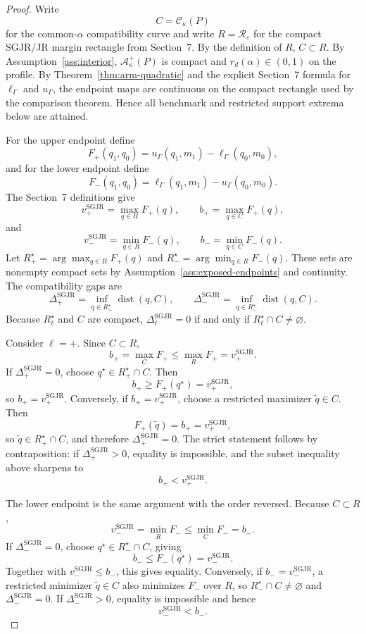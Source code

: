 \begin{proof}
Write
\[
  C=\mathcal C_\kappa(P)
\]
for the common-\(\alpha\) compatibility curve and write \(R=\mathcal R_\varepsilon\) for the compact SGJR/JR margin rectangle from Section~7.  By the definition of \(R\), \(C\subset R\).  By Assumption~\ref{ass:interior}, \(\mathcal A_\kappa^+(P)\) is compact and \(r_d(\alpha)\in(0,1)\) on the profile.  By Theorem~\ref{thm:arm-quadratic} and the explicit Section~7 formula for \(\ell_\Gamma\) and \(u_\Gamma\), the endpoint maps are continuous on the compact rectangle used by the comparison theorem.  Hence all benchmark and restricted support extrema below are attained.

For the upper endpoint define
\[
  F_+(q_1,q_0)=u_\Gamma(q_1,m_1)-\ell_\Gamma(q_0,m_0),
\]
and for the lower endpoint define
\[
  F_-(q_1,q_0)=\ell_\Gamma(q_1,m_1)-u_\Gamma(q_0,m_0).
\]
The Section~7 definitions give
\[
  v_+^{\mathrm{SGJR}}=\max_{q\in R}F_+(q),\qquad
  b_+=\max_{q\in C}F_+(q),
\]
and
\[
  v_-^{\mathrm{SGJR}}=\min_{q\in R}F_-(q),\qquad
  b_-=\min_{q\in C}F_-(q).
\]
Let \(R_+^\star=\arg\max_{q\in R}F_+(q)\) and \(R_-^\star=\arg\min_{q\in R}F_-(q)\).  These sets are nonempty compact sets by Assumption~\ref{ass:exposed-endpoints} and continuity.  The compatibility gaps are
\[
  \Delta_+^{\mathrm{SGJR}}=\inf_{q\in R_+^\star}\operatorname{dist}(q,C),
  \qquad
  \Delta_-^{\mathrm{SGJR}}=\inf_{q\in R_-^\star}\operatorname{dist}(q,C).
\]
Because \(R_\ell^\star\) and \(C\) are compact, \(\Delta_\ell^{\mathrm{SGJR}}=0\) if and only if \(R_\ell^\star\cap C\ne\varnothing\).

Consider \(\ell=+\).  Since \(C\subset R\),
\[
  b_+=\max_C F_+\le \max_R F_+=v_+^{\mathrm{SGJR}}.
\]
If \(\Delta_+^{\mathrm{SGJR}}=0\), choose \(q^\star\in R_+^\star\cap C\).  Then
\[
  b_+\ge F_+(q^\star)=v_+^{\mathrm{SGJR}},
\]
so \(b_+=v_+^{\mathrm{SGJR}}\).  Conversely, if \(b_+=v_+^{\mathrm{SGJR}}\), choose a restricted maximizer \(\tilde q\in C\).  Then
\[
  F_+(\tilde q)=b_+=v_+^{\mathrm{SGJR}},
\]
so \(\tilde q\in R_+^\star\cap C\), and therefore \(\Delta_+^{\mathrm{SGJR}}=0\).  The strict statement follows by contraposition: if \(\Delta_+^{\mathrm{SGJR}}>0\), equality is impossible, and the subset inequality above sharpens to
\[
  b_+<v_+^{\mathrm{SGJR}}.
\]

The lower endpoint is the same argument with the order reversed.  Because \(C\subset R\),
\[
  v_-^{\mathrm{SGJR}}=\min_R F_-\le \min_C F_-=b_-.
\]
If \(\Delta_-^{\mathrm{SGJR}}=0\), choose \(q^\star\in R_-^\star\cap C\), giving
\[
  b_-\le F_-(q^\star)=v_-^{\mathrm{SGJR}}.
\]
Together with \(v_-^{\mathrm{SGJR}}\le b_-\), this gives equality.  Conversely, if \(b_-=v_-^{\mathrm{SGJR}}\), a restricted minimizer \(\tilde q\in C\) also minimizes \(F_-\) over \(R\), so \(R_-^\star\cap C\ne\varnothing\) and \(\Delta_-^{\mathrm{SGJR}}=0\).  If \(\Delta_-^{\mathrm{SGJR}}>0\), equality is impossible and hence
\[
  v_-^{\mathrm{SGJR}}<b_-.
\]


\end{proof}
